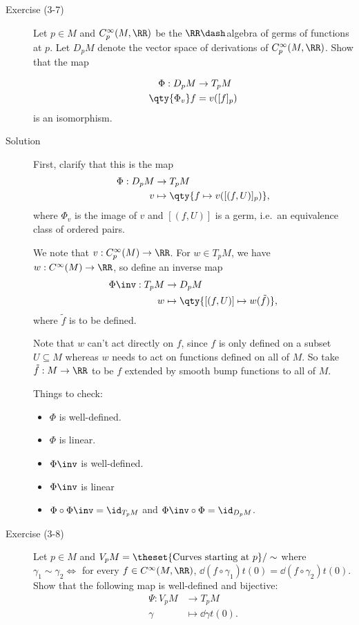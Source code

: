 \begin{description}
\item[Exercise (3-7)]
Let \(p\in M\) and \(C_p^\infty(M, \RR)\) be the \(\RR\dash\)algebra of
germs of functions at \(p\). Let \(D_p M\) denote the vector space of
derivations of \(C_p^\infty(M, \RR)\). Show that the map

\begin{align*}
\Phi: D_p M &\to T_p M \\
\qty{\Phi_v} f &= v([f]_p)
\end{align*} is an isomorphism.
\item[Solution]
\hfill

First, clarify that this is the map \begin{align*}
\Phi: D_p M &\to T_p M \\
v &\mapsto \qty{ f \mapsto v([(f, U)]_p) }
,\end{align*} where \(\Phi_v\) is the image of \(v\) and \([(f, U)]\) is
a germ, i.e.~an equivalence class of ordered pairs.

We note that \(v: C_p^\infty(M) \to \RR\). For \(w\in T_p M\), we have
\(w: C^{\infty}(M) \to \RR\), so define an inverse map \begin{align*}
\Phi\inv: T_p M &\to D_p M \\
w &\mapsto \qty{ [(f, U)] \mapsto w(\tilde f) }
,\end{align*} where \(\tilde f\) is to be defined.

Note that \(w\) can't act directly on \(f\), since \(f\) is only defined
on a subset \(U\subseteq M\) whereas \(w\) needs to act on functions
defined on all of \(M\). So take \(\tilde f: M\to \RR\) to be \(f\)
extended by smooth bump functions to all of \(M\).

Things to check:

\begin{itemize}
\tightlist
\item
  \(\Phi\) is well-defined.
\item
  \(\Phi\) is linear.
\item
  \(\Phi\inv\) is well-defined.
\item
  \(\Phi\inv\) is linear
\item
  \(\Phi \circ \Phi\inv = \id_{T_p M}\) and
  \(\Phi\inv \circ \Phi = \id_{D_p M}\).
\end{itemize}
\item[Exercise (3-8)]
Let \(p\in M\) and
\(V_p M = \theset{\text{Curves starting at } p}/\sim\) where
\(\gamma_1\sim \gamma_2 \iff\) for every \(f\in C^\infty(M, \RR)\),
\(\dd{(f\circ \gamma_1)}{t}(0) = \dd{(f\circ \gamma_2)}{t}(0)\). Show
that the following map is well-defined and bijective: \begin{align*}
\Psi: V_p M &\to T_p M \\
\gamma &\mapsto \dd{\gamma}{t}(0)
.\end{align*}
\end{description}


